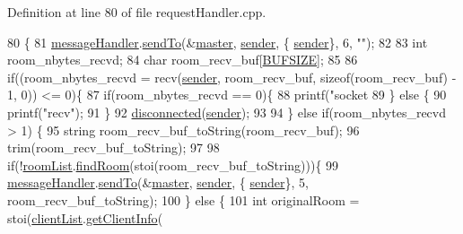 Definition at line 80 of file request\+Handler.\+cpp.


\begin{DoxyCode}
80                                        \{
81     \hyperlink{class_request_handler_aada097c13d8b393e1c067aad65e3df1f}{messageHandler}.\hyperlink{class_message_handler_a81dd916f61ef7f19d10cd3adee55bda9}{sendTo}(&\hyperlink{class_request_handler_a213fc8dcf839e70561a591633546d98f}{master}, \hyperlink{class_request_handler_a6323c8ad9911e4872973360dc83d87ea}{sender}, \{
      \hyperlink{class_request_handler_a6323c8ad9911e4872973360dc83d87ea}{sender}\}, 6, \textcolor{stringliteral}{""});
82 
83     \textcolor{keywordtype}{int} room\_nbytes\_recvd;
84     \textcolor{keywordtype}{char} room\_recv\_buf[\hyperlink{client_8cpp_aeca034f67218340ecb2261a22c2f3dcd}{BUFSIZE}];
85 
86     \textcolor{keywordflow}{if}((room\_nbytes\_recvd = recv(\hyperlink{class_request_handler_a6323c8ad9911e4872973360dc83d87ea}{sender}, room\_recv\_buf, \textcolor{keyword}{sizeof}(room\_recv\_buf) - 1, 0)) <= 0)\{
87         \textcolor{keywordflow}{if}(room\_nbytes\_recvd == 0)\{
88             printf(\textcolor{stringliteral}{"socket %
89         \} \textcolor{keywordflow}{else} \{    
90             printf(\textcolor{stringliteral}{"recv"});
91         \}
92         \hyperlink{class_request_handler_ac017e06204f80a122cfa537b99fcba42}{disconnected}(\hyperlink{class_request_handler_a6323c8ad9911e4872973360dc83d87ea}{sender}); 
93 
94     \} \textcolor{keywordflow}{else} \textcolor{keywordflow}{if}(room\_nbytes\_recvd > 1) \{
95         \textcolor{keywordtype}{string} room\_recv\_buf\_toString(room\_recv\_buf);
96         trim(room\_recv\_buf\_toString);
97     
98         \textcolor{keywordflow}{if}(!\hyperlink{class_request_handler_ab9b9a6905d1204e15670b780a381d1bf}{roomList}.\hyperlink{class_room_list_a71bcf58fd27f5be3d742743edc71470c}{findRoom}(stoi(room\_recv\_buf\_toString)))\{
99             \hyperlink{class_request_handler_aada097c13d8b393e1c067aad65e3df1f}{messageHandler}.\hyperlink{class_message_handler_a81dd916f61ef7f19d10cd3adee55bda9}{sendTo}(&\hyperlink{class_request_handler_a213fc8dcf839e70561a591633546d98f}{master}, \hyperlink{class_request_handler_a6323c8ad9911e4872973360dc83d87ea}{sender}, \{
      \hyperlink{class_request_handler_a6323c8ad9911e4872973360dc83d87ea}{sender}\}, 5, room\_recv\_buf\_toString);
100         \} \textcolor{keywordflow}{else} \{
101             \textcolor{keywordtype}{int} originalRoom = stoi(\hyperlink{class_request_handler_ae7e83bca62e779a7d642b955a2e3ec5c}{clientList}.\hyperlink{class_client_list_a6c3d393ac36a1227dab58228b696ac4c}{getClientInfo}(
}
\end{DoxyCode}
